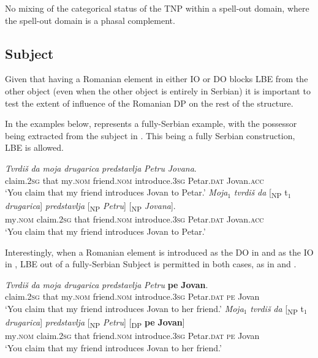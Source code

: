 \documentclass[output=paper,hidelinks,newtxmath,]{langscibook}
\begin{document}
\ea\label{15:ex26}
  No mixing of the categorical status of the TNP within a spell-out domain, where the spell-out domain is a phasal complement.
\z

\subsection{Subject}\label{15:s5.3}

Given that having a Romanian element in either IO or DO blocks LBE from the other object (even when the other object is entirely in Serbian) it is important to test the extent of influence of the Romanian DP on the rest of the structure.

In the examples below,  represents a fully-Serbian example, with the possessor being extracted from the subject in . This being a fully Serbian construction, LBE is allowed.

\ea \label{15:ex27}
	\ea\label{15:ex27a}
    \gll \textit{Tvrdiš} \textit{da} \textit{moja} \textit{drugarica} \textit{predstavlja} \textit{Petru} \textit{Jovana}.\\          
         claim\textsc{.2sg} that my\textsc{.nom} friend\textsc{.nom} introduce\textsc{.3sg} Petar\textsc{.dat} Jovan\textsc{.acc}\\
         \glt `You claim that my friend introduces Jovan to Petar.'
	\ex\label{15:ex27b}
    \gll \textit{Moja}$_1$ \textit{tvrdiš} \textit{da} [\textsubscript{NP} t$_1$ \textit{drugarica}] \textit{predstavlja} [\textsubscript{NP} \textit{Petru}] [\textsubscript{NP} \textit{Jovana}].\\
         my\textsc{.nom} claim\textsc{.2sg} that {} {} friend\textsc{.nom} introduce\textsc{.3sg} {} Petar\textsc{.dat} {} Jovan\textsc{.acc}\\ 
         \glt `You claim that my friend introduces Jovan to Petar.'
	\z
\z

\noindent Interestingly, when a Romanian element is introduced as the DO in  and as the IO in , LBE out of a fully-Serbian Subject is permitted in both cases, as in  and .

\ea \label{15:ex28}
	\ea\label{15:ex28a}
    \gll \textit{Tvrdiš} \textit{da} \textit{moja} \textit{drugarica} \textit{predstavlja} \textit{Petru} \textbf{pe} \textbf{Jovan}.\\          
         claim\textsc{.2sg} that my\textsc{.nom} friend\textsc{.nom} introduce\textsc{.3sg} Petar\textsc{.dat} \textsc{pe} Jovan\\
         \glt `You claim that my friend introduces Jovan to her friend.'
	\ex\label{15:ex28b}
    \gll \textit{Moja}$_1$ \textit{tvrdiš} \textit{da} [\textsubscript{NP} t$_1$ \textit{drugarica}] \textit{predstavlja} [\textsubscript{NP} \textit{Petru}] [\textsubscript{DP} \textbf{pe} \textbf{Jovan}]\\
         my\textsc{.nom} claim\textsc{.2sg} that {} {} friend\textsc{.nom} introduce\textsc{.3sg} {} Petar\textsc{.dat} {} \textsc{pe} Jovan\\ 
                  \glt `You claim that my friend introduces Jovan to her friend.'
	\z
\z
\end{document}
